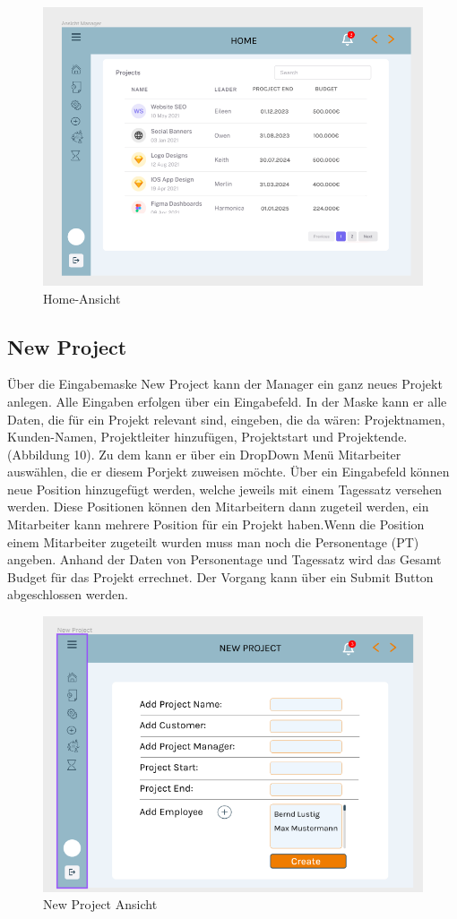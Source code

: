 \documentclass{article}
\begin{document}
\begin{figure}[h]
    \includegraphics[height= 0.5\textwidth,width= \textwidth]{images/Home.png}
    \caption{Home-Ansicht}
    \label{fig:beispiel}
\end{figure}

\newpage
\subsection{New Project}
Über die Eingabemaske New Project kann der Manager ein ganz neues Projekt anlegen. Alle Eingaben erfolgen über ein Eingabefeld. In der Maske kann er alle Daten, die für ein Projekt relevant sind, eingeben, die da wären: Projektnamen, Kunden-Namen, Projektleiter hinzufügen, Projektstart und  Projektende. (Abbildung 10). 
Zu dem kann er über ein DropDown Menü Mitarbeiter auswählen, die
er diesem Porjekt zuweisen möchte. Über ein Eingabefeld können neue
Position hinzugefügt werden, welche jeweils mit einem Tagessatz versehen werden.
Diese Positionen können den Mitarbeitern dann zugeteil werden, ein Mitarbeiter
kann mehrere Position für ein Projekt haben.Wenn die Position einem Mitarbeiter 
zugeteilt wurden muss man noch die Personentage (PT) angeben. Anhand
der Daten von Personentage und Tagessatz wird das Gesamt Budget für das 
Projekt errechnet. Der Vorgang kann über ein Submit Button abgeschlossen werden.


\begin{figure}[h]
    \includegraphics[height= 0.5\textwidth,width= \textwidth]{images/New Project.png}
    \caption{New Project Ansicht}
    \label{fig:beispiel}
\end{figure}
\end{document}
